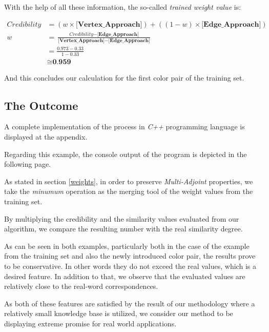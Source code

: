 \documentclass[egilmezThesis.tex]{subfiles}
\begin{document}
With the help of all these information, the so-called \textit{trained weight value} is:

\begin{equation}
\begin{split}
\textit{Credibility} &= (w \times  \textbf{[Vertex\_Approach]}) + ((1-w) \times  \textbf{[Edge\_Approach]})\\
w &= \frac{\textit{Credibility} -\textbf{[Edge\_Approach]}}{ \textbf{[Vertex\_Approach]} - \textbf{[Edge\_Approach]}}\\
&=\frac{0.973-0.33}{1-0.33}\\
&\cong{\textbf{0.959}}
\end{split} 
\end{equation}

And this concludes our calculation for the first color pair of the training set.

\subsection{The Outcome}
\label{TCO}

A complete implementation of the process in \textit{C++} programming language is displayed at the appendix.

Regarding this example, the console output of the program is depicted in the following page.

As stated in section \ref{weights}, in order to preserve \textit{Multi-Adjoint} properties, we take the \textit{minumum} operation as the merging tool of the weight values from the training set.

By multiplying the credibility and the similarity  values evaluated from our algorithm, we compare the resulting number with the real similarity degree.

As can be seen in both examples, particularly both in the case of the example from the training set and also the newly introduced color pair, the results prove to be conservative. In other words they do not exceed the real values, which is a desired feature. In addition to that, we observe that the evaluated values are relatively close to the real-word correspondences. 

As both of these features are satisfied by the result of our methodology where a relatively small knowledge base is utilized, we consider our method to be displaying extreme promise for real world applications.
\end{document}
